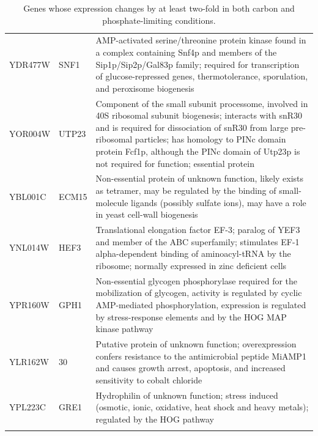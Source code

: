 \documentclass[letter]{article}\usepackage{graphicx, color}
\begin{document}
\begin{longtable}{lll}
  YDR477W & SNF1 & AMP-activated serine/threonine protein kinase found in a complex containing Snf4p and members of the Sip1p/Sip2p/Gal83p family; required for transcription of glucose-repressed genes, thermotolerance, sporulation, and peroxisome biogenesis \\ 
  YOR004W & UTP23 & Component of the small subunit processome, involved in 40S ribosomal subunit biogenesis; interacts with snR30 and is required for dissociation of snR30 from large pre-ribosomal particles; has homology to PINc domain protein Fcf1p, although the PINc domain of Utp23p is not required for function; essential protein \\ 
  YBL001C & ECM15 & Non-essential protein of unknown function, likely exists as tetramer, may be regulated by the binding of small-molecule ligands (possibly sulfate ions), may have a role in yeast cell-wall biogenesis \\ 
  YNL014W & HEF3 & Translational elongation factor EF-3; paralog of YEF3 and member of the ABC superfamily; stimulates EF-1 alpha-dependent binding of aminoacyl-tRNA by the ribosome; normally expressed in zinc deficient cells \\ 
  YPR160W & GPH1 & Non-essential glycogen phosphorylase required for the mobilization of glycogen, activity is regulated by cyclic AMP-mediated phosphorylation, expression is regulated by stress-response elements and by the HOG MAP kinase pathway \\ 
  YLR162W & 30 & Putative protein of unknown function; overexpression confers resistance to the antimicrobial peptide MiAMP1 and causes growth arrest, apoptosis, and increased sensitivity to cobalt chloride \\ 
  YPL223C & GRE1 & Hydrophilin of unknown function; stress induced (osmotic, ionic, oxidative, heat shock and heavy metals); regulated by the HOG pathway \\ 
   \hline
\hline
\caption{Genes whose expression changes by at least two-fold in both carbon and phosphate-limiting conditions.}
\label{two.fold}
\end{longtable}
\end{document}
